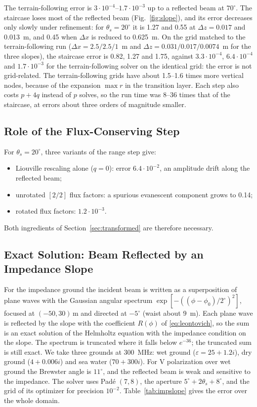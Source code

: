 \documentclass[journal]{IEEEtran}
\begin{document}
The terrain-following error is $3\cdot10^{-4}$--$1.7\cdot10^{-3}$ up to a
reflected beam at $70^\circ$. The staircase loses most of the reflected beam (Fig.~\ref{fig:slope}),
and its error decreases only slowly under refinement: for $\theta_s=20^\circ$
it is 1.27 and 0.55 at $\Delta z=0.017$ and \SI{0.013}{m}, and 0.45 when
$\Delta x$ is reduced to \SI{0.625}{m}.  On the grid matched to the
terrain-following run ($\Delta x=2.5/2.5/1$~m and
$\Delta z=0.031/0.017/0.0074$~m for the three slopes), the staircase error
is 0.82, 1.27 and 1.75, against $3.3\cdot10^{-4}$, $6.4\cdot10^{-4}$ and
$1.7\cdot10^{-3}$ for the terrain-following solver on the identical grid:
the error is not grid-related. The terrain-following grids have about 1.5--1.6 times more vertical
nodes, because of the expansion $\max r$ in the transition layer. Each step
also costs $p+4q$ instead of $p$ solves, so the run time was 8--36 times that
of the staircase, at errors about three orders of magnitude smaller.

\subsection{Role of the Flux-Conserving Step}

For $\theta_s=20^\circ$, three variants of the range step give:
\begin{itemize}
\item Liouville rescaling alone ($q=0$): error $6.4\cdot10^{-2}$, an amplitude drift
along the reflected beam;
\item unrotated $[2/2]$ flux factors: a spurious evanescent component grows to
0.14;
\item rotated flux factors: $1.2\cdot10^{-3}$.
\end{itemize}
Both ingredients of Section~\ref{sec:transformed} are therefore necessary.

\subsection{Exact Solution: Beam Reflected by an Impedance Slope}\label{sec:impslope}

For the impedance ground the incident beam is written as a superposition of
plane waves with the Gaussian angular spectrum
$\exp[-((\phi-\phi_0)/2^\circ)^2]$, focused at $(-50,30)$\,m and directed at
$-5^\circ$ (waist about \SI{9}{m}). Each plane wave is reflected by the slope with
the coefficient $R(\phi)$ of \eqref{eq:leontovich}, so the sum is an exact
solution of the Helmholtz equation with the impedance condition on the slope. The
spectrum is truncated where it falls below $e^{-36}$; the truncated sum is still
exact. We take three grounds at \SI{300}{MHz}: wet ground ($\varepsilon=25+1.2i$),
dry ground ($4+0.006i$) and sea water ($70+300i$). For V polarization over wet
ground the Brewster angle is $11^\circ$, and the reflected beam is weak and
sensitive to the impedance. The solver uses Pad\'e $(7,8)$, the aperture
$5^\circ+2\theta_s+8^\circ$, and the grid of its optimizer for precision
$10^{-2}$. Table~\ref{tab:impslope} gives the error over the whole domain.
\end{document}
